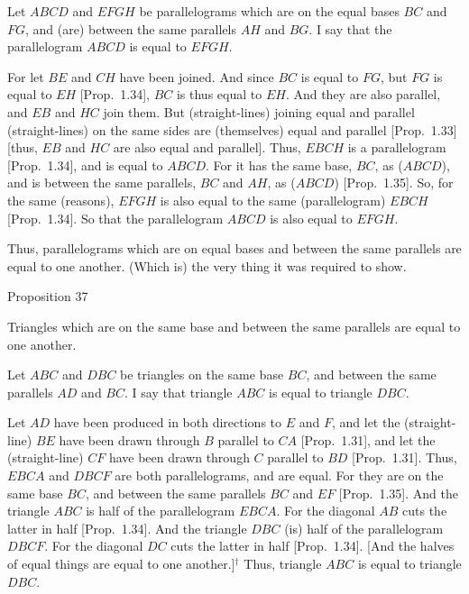 Let $ABCD$ and $EFGH$ be parallelograms which are on the equal bases $BC$
and $FG$, and (are) between the same parallels $AH$ and $BG$. I say that
the parallelogram $ABCD$ is equal to $EFGH$.

\epsfysize=1.5in
\centerline{}

For let $BE$ and $CH$ have been joined. And since $BC$ is equal to $FG$, but $FG$ is equal to $EH$ [Prop.~1.34], $BC$ is thus equal to $EH$. And they are also parallel, and $EB$ and $HC$ join them.
But (straight-lines) joining equal and parallel (straight-lines) on the
same sides are (themselves) equal and parallel [Prop.~1.33] [thus, $EB$ and $HC$
are also equal and parallel]. Thus, $EBCH$ is a parallelogram [Prop.~1.34],
and is equal to $ABCD$. For it has  the
same base, $BC$, as ($ABCD$), and is between the same parallels, $BC$ and $AH$, as ($ABCD$) [Prop.~1.35]. So,
for the same (reasons), $EFGH$ is also equal to the same (parallelogram) $EBCH$ [Prop.~1.34].  So that the
parallelogram $ABCD$ is  also equal to $EFGH$.

Thus, parallelograms which are on equal bases and between the same parallels are equal to one another. (Which is) the very thing it was required
to show.


\begin{center}
{\large Proposition 37}
\end{center}

Triangles which are on the same base and between the same parallels
are equal to one another.

\epsfysize=1.25in
\centerline{}

Let $ABC$ and $DBC$ be triangles on the same base $BC$, and between
the same parallels $AD$ and $BC$. I say that triangle $ABC$ is equal to triangle $DBC$.

Let $AD$ have been produced in both directions to $E$ and $F$, and let the
(straight-line) $BE$ have been drawn through $B$ parallel to $CA$ [Prop.~1.31],
and let the (straight-line) $CF$ have been drawn through $C$ parallel to
$BD$ [Prop.~1.31]. Thus, $EBCA$ and $DBCF$ are both parallelograms,
and are equal. For they are on the same base $BC$, and between
the same parallels $BC$ and $EF$ [Prop.~1.35]. And the triangle $ABC$ is
half of 
the parallelogram
$EBCA$. For the diagonal $AB$ cuts the latter in half [Prop.~1.34]. And the 
triangle $DBC$ (is) half of the parallelogram $DBCF$. For the diagonal
$DC$ cuts the latter in half [Prop.~1.34]. [And the halves of equal things are
equal to one another.]$^\dag$
Thus, triangle $ABC$ is equal to triangle $DBC$.

